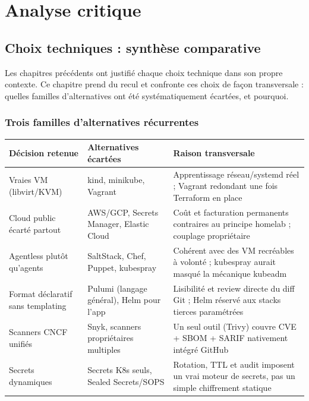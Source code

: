 \documentclass[12pt,a4paper,twoside,openright]{report}
\begin{document}
\part{Analyse critique}

\chapter{Choix techniques : synthèse comparative}

Les chapitres précédents ont justifié chaque choix technique dans son propre
contexte. Ce chapitre prend du recul et confronte ces choix de façon transversale :
quelles familles d'alternatives ont été systématiquement écartées, et pourquoi.

\section{Trois familles d'alternatives récurrentes}

\begin{center}\end{center}
\begin{longtable}{@{}p{4.0cm}p{4.6cm}p{5.6cm}@{}}
\toprule
\textbf{Décision retenue} & \textbf{Alternatives écartées} & \textbf{Raison transversale} \\
\midrule
\endhead
Vraies VM (libvirt/KVM) & kind, minikube, Vagrant & Apprentissage réseau/systemd réel ; Vagrant redondant une fois Terraform en place \\
Cloud public écarté partout & AWS/GCP, Secrets Manager, Elastic Cloud & Coût et facturation permanents contraires au principe homelab ; couplage propriétaire \\
Agentless plutôt qu'agents & SaltStack, Chef, Puppet, kubespray & Cohérent avec des VM recréables à volonté ; kubespray aurait masqué la mécanique kubeadm \\
Format déclaratif sans templating & Pulumi (langage général), Helm pour l'app & Lisibilité et review directe du diff Git ; Helm réservé aux stacks tierces paramétrées \\
Scanners CNCF unifiés & Snyk, scanners propriétaires multiples & Un seul outil (Trivy) couvre CVE + SBOM + SARIF nativement intégré GitHub \\
Secrets dynamiques & Secrets K8s seuls, Sealed Secrets/SOPS & Rotation, TTL et audit imposent un vrai moteur de secrets, pas un simple chiffrement statique \\
\bottomrule
\end{longtable}
\end{document}
